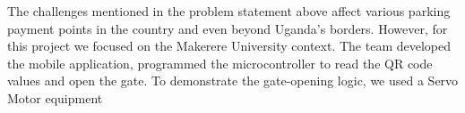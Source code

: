 The challenges mentioned in the problem statement above affect various parking payment points in the country and even beyond Uganda's borders. However, for this project we focused on the Makerere University context.
The team developed the mobile application, programmed the microcontroller to read the QR code values and open the gate. To demonstrate the gate-opening logic, we used a Servo Motor equipment

